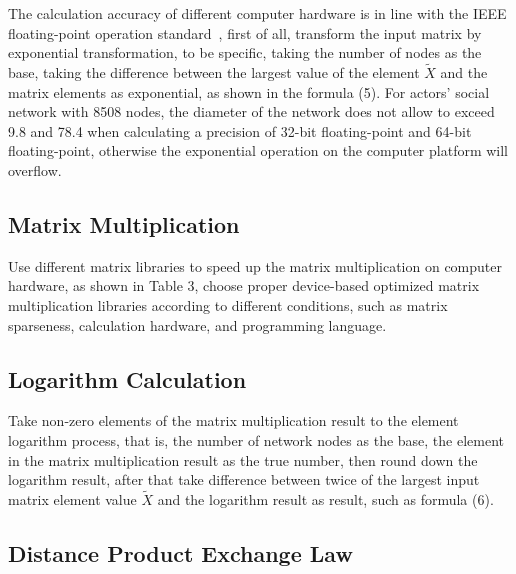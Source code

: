 \documentclass[review]{cvpr}
\begin{document}
The calculation accuracy of different computer hardware is in line with the IEEE floating-point operation standard~\cite{ieee1985ieee},
first of all, transform the input matrix by exponential transformation, to be specific, taking the number of nodes as the base,
taking the difference between the largest value of the element $\widetilde X$ and the matrix elements as exponential, as shown in the formula (5).
\eg For actors' social network with 8508 nodes, the diameter of the network does not allow to exceed 9.8 and 78.4 when calculating a precision of 32-bit floating-point and 64-bit floating-point,
otherwise the exponential operation on the computer platform will overflow.

\subsection{Matrix Multiplication}
Use different matrix libraries to speed up the matrix multiplication on computer hardware, as shown in Table 3, choose proper device-based optimized matrix multiplication libraries according to different conditions, such as matrix sparseness, calculation hardware, and programming language.

\subsection{Logarithm Calculation}
Take non-zero elements of the matrix multiplication result to the element logarithm process, that is, the number of network nodes as the base, the element in the matrix multiplication result as the true number, then round down the logarithm result,
after that take difference between twice of the largest input matrix element value $\widetilde X$ and the logarithm result as result, such as formula (6).

\subsection{Distance Product Exchange Law}
\end{document}
